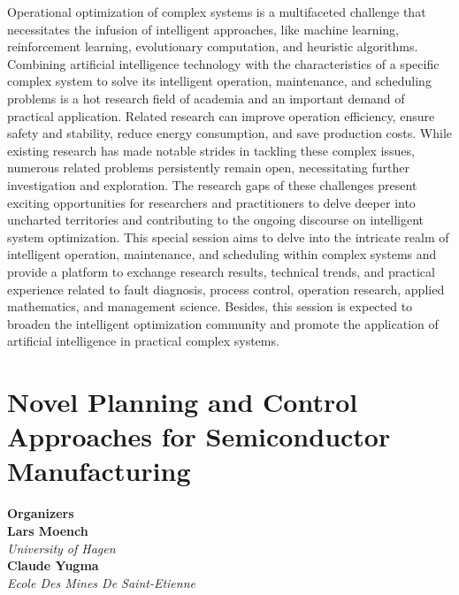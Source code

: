 Operational optimization of complex systems is a multifaceted challenge that necessitates the infusion of intelligent approaches, like machine learning, reinforcement learning, evolutionary computation, and heuristic algorithms. Combining artificial intelligence technology with the characteristics of a specific complex system to solve its intelligent operation, maintenance, and scheduling problems is a hot research field of academia and an important demand of practical application. Related research can improve operation efficiency, ensure safety and stability, reduce energy consumption, and save production costs.  While existing research has made notable strides in tackling these complex issues, numerous related problems persistently remain open, necessitating further investigation and exploration. The research gaps of these challenges present exciting opportunities for researchers and practitioners to delve deeper into uncharted territories and contributing to the ongoing discourse on intelligent system optimization. This special session aims to delve into the intricate realm of intelligent operation, maintenance, and scheduling within complex systems and provide a platform to exchange research results, technical trends, and practical experience related to fault diagnosis, process control, operation research, applied mathematics, and management science. Besides, this session is expected to broaden the intelligent optimization community and promote the application of artificial intelligence in practical complex systems. 

\section{Novel Planning and Control Approaches for Semiconductor Manufacturing}


\large \textbf{Organizers} \normalsize \vspace{2mm} \\
\textbf{Lars  Moench} \\ 
\textit{University of Hagen} \vspace{{2mm}} \\
\textbf{Claude  Yugma} \\ 
\textit{Ecole Des Mines De Saint-Etienne}

